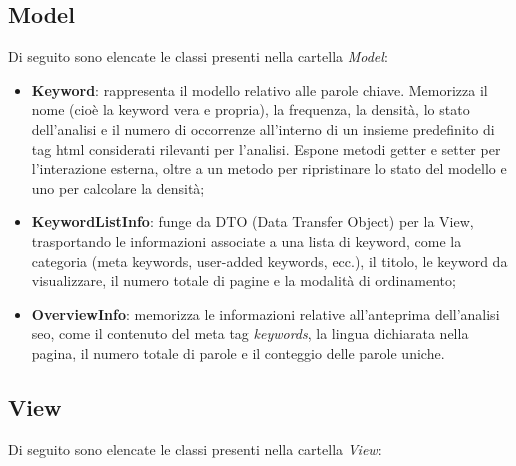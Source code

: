 \subsection{Model}

\par Di seguito sono elencate le classi presenti nella cartella \textit{Model}:

\begin{itemize}
  \item \textbf{Keyword}: rappresenta il modello relativo alle parole chiave. Memorizza il nome (cioè la keyword vera e propria), la frequenza, la densità, lo stato dell’analisi e il numero di occorrenze all’interno di un insieme predefinito di tag \gls{html} considerati rilevanti per l’analisi. Espone metodi getter e setter per l’interazione esterna, oltre a un metodo per ripristinare lo stato del modello e uno per calcolare la densità;
  \item \textbf{KeywordListInfo}: funge da DTO (Data Transfer Object) per la View, trasportando le informazioni associate a una lista di keyword, come la categoria (meta keywords, user-added keywords, ecc.), il titolo, le keyword da visualizzare, il numero totale di pagine e la modalità di ordinamento;
  \item \textbf{OverviewInfo}: memorizza le informazioni relative all’anteprima dell’analisi \gls{seo}, come il contenuto del meta tag \textit{keywords}, la lingua dichiarata nella pagina, il numero totale di parole e il conteggio delle parole uniche.
\end{itemize}

\subsection{View}

\par Di seguito sono elencate le classi presenti nella cartella \textit{View}:

